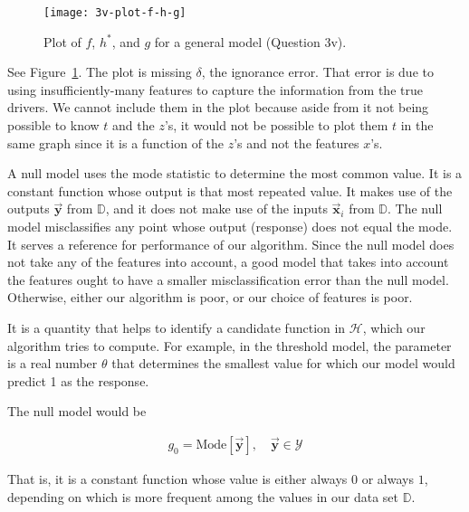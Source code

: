 \documentclass[12pt]{article}
\begin{document}
\begin{enumerate}
\begin{figure}
	\centering
	\texttt{[image: 3v-plot-f-h-g]}
	\caption{Plot of $f$, $h^*$, and $g$ for a general model (Question 3v).}
	\label{fig:plot-3z}
\end{figure}
See Figure~\ref{fig:plot-3z}. The plot is missing $\delta$, the ignorance error. That error
is due to using insufficiently-many features to capture the information from the true
drivers. We cannot include them in the plot because aside from it not being possible
to know $t$ and the $z$'s, it would not be possible to plot them $t$ in the same
graph since it is a function of the $z$'s and not the features $x$'s.


A null model uses the mode statistic to determine the most common value. It is a constant
function whose output is that most repeated value. It makes use of the outputs $\vec{\mathbf{y}}$
from $\mathbb{D}$, and it does not make use of the inputs $\vec{\mathbf{x}}_i$ from $\mathbb{D}$.
The null model misclassifies any point whose output (response) does not equal the mode.
It serves a reference for performance of our algorithm. Since the null model does not take
any of the features into account, a good model that takes into account the features ought to have
a smaller misclassification error than the null model. Otherwise, either our algorithm is
poor, or our choice of features is poor.


It is a quantity that helps to identify a candidate function in $\mathcal{H}$, which
our algorithm tries to compute. For example, in the threshold model, the parameter
is a real number $\theta$ that determines the smallest value for which
our model would predict 1 as the response.


The null model would be

\begin{align*}
	g_0 = \text{Mode}[\vec{\mathbf{y}}],\quad \vec{\mathbf{y}}\in \mathcal{Y}
\end{align*}

That is, it is a constant function whose value is either always $0$ or always $1$,
depending on which is more frequent among the values in our data set $\mathbb{D}$.


\end{enumerate}
\end{document}
